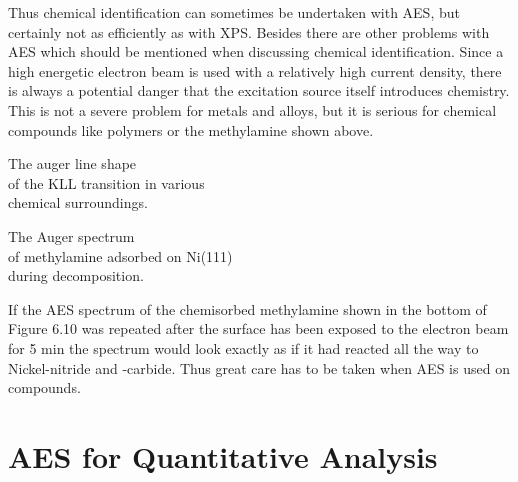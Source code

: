           Thus chemical identification  can  sometimes  be  undertaken
          with AES, but  certainly  not  as  efficiently  as  with  XPS.
          Besides there are other problems with AES  which  should  be
          mentioned when discussing chemical identification.  Since  a
          high energetic electron beam is used with  a  relatively  high
          current density, there is always a potential danger that  the
          excitation source itself introduces chemistry. This is not  a
          severe problem for metals and alloys, but it is serious for
          chemical compounds like polymers or the methylamine shown
          above.

             \newpage {} The auger line
          shape\\ of the KLL transition in various\\ chemical
          surroundings. 

                                 \vspace{9cm}

               The  Auger  spectrum \\  of
          methylamine adsorbed on Ni(111)\\ during decomposition.

                                           \newpage



           If the AES spectrum of the chemisorbed  methylamine
          shown in the bottom of Figure 6.10 was  repeated  after  the
          surface has been exposed to the electron beam for 5 min  the
          spectrum would look exactly as if it had reacted all the way
          to Nickel-nitride and -carbide. Thus great care  has  to  be
          taken when AES is used on compounds.


             \section{AES for Quantitative Analysis}


